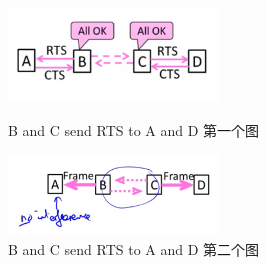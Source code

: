 \documentclass[12pt]{ctexart}   %
\begin{document}
\begin{itemize}
		\begin{figure}
			\begin{minipage}[t]{0.5\linewidth}
				\centering
				\includegraphics[width=2.2in]{images/3-6-7}
				\caption{B and C send RTS to A and D  第一个图 }
				\label{fig:3-6-7}
			\end{minipage}
			\begin{minipage}[t]{0.5\linewidth}
				\centering
				\includegraphics[width=2.2in]{images/3-6-8}
				\caption{B and C send RTS to A and D 第二个图}
				\label{fig:3-6-8}
			\end{minipage}
		\end{figure}
		
	\end{itemize}
	
\end{document}
